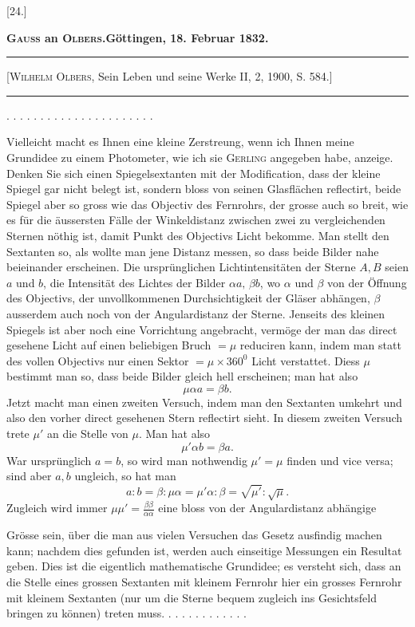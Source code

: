 \clearpage\begingroup
{}
\begin{center}
[24.]\par\medskip
\textbf{\textsc{Gauss} an \textsc{Olbers}.\quad Göttingen, 18. Februar 1832.}\par\medskip
\rule{.78\linewidth}{.4pt}\par\smallskip
{\footnotesize [\textsc{Wilhelm Olbers}, Sein Leben und seine Werke II, 2, 1900, S. 584.]}\par\smallskip
\rule{.78\linewidth}{.4pt}
\end{center}
\noindent . . . . . . . . . . . . . . . . . . . . . .\par
\noindent\hspace*{\parindent}Vielleicht macht es Ihnen eine kleine Zerstreung, wenn ich Ihnen meine Grundidee zu einem Photometer, wie ich sie \textsc{Gerling} angegeben habe, anzeige. Denken Sie sich einen Spiegelsextanten mit der Modification, dass der kleine Spiegel gar nicht belegt ist, sondern bloss von seinen Glasflächen reflectirt, beide Spiegel aber  so gross wie das Objectiv des Fernrohrs, der grosse auch so breit, wie es für die äussersten Fälle der Winkeldistanz zwischen zwei zu vergleichenden Sternen nöthig ist, damit  Punkt des Objectivs Licht bekomme. Man stellt den Sextanten so, als wollte man jene Distanz messen, so dass beide Bilder nahe beieinander erscheinen. Die ursprünglichen Lichtintensitäten der Sterne $A,B$ seien $a$ und $b$, die Intensität des Lichtes der Bilder $\alpha a,\,\beta b$, wo $\alpha$ und $\beta$ von der Öffnung des Objectivs, der unvollkommenen Durchsichtigkeit der Gläser abhängen, $\beta$ ausserdem auch noch von der Angulardistanz der Sterne. Jenseits des kleinen Spiegels ist aber noch eine Vorrichtung angebracht, vermöge der man das direct gesehene Licht auf einen beliebigen Bruch $=\mu$ reduciren kann, indem man statt des vollen Objectivs nur einen Sektor $=\mu\times360^{0}$ Licht verstattet. Diess $\mu$ bestimmt man so, dass beide Bilder gleich hell erscheinen; man hat also
\[
\mu\alpha a=\beta b.
\]
\noindent Jetzt macht man einen zweiten Versuch, indem man den Sextanten umkehrt und also den vorher direct gesehenen Stern reflectirt sieht. In diesem zweiten Versuch trete $\mu'$ an die Stelle von $\mu$. Man hat also
\[
\mu'\alpha b=\beta a.
\]
\noindent War ursprünglich $a=b$, so wird man nothwendig $\mu'=\mu$ finden und vice versa; sind aber $a,b$ ungleich, so hat man
\[
a:b=\beta:\mu\alpha=\mu'\alpha:\beta=\sqrt{\mu'}:\sqrt{\mu}.
\]
\noindent Zugleich wird immer $\mu\mu'=\frac{\beta\beta}{\alpha\alpha}$ eine bloss von der Angulardistanz abhängige
\par\clearpage{}
\noindent Grösse sein, über die man aus vielen Versuchen das Gesetz ausfindig machen kann; nachdem dies gefunden ist, werden auch einseitige Messungen ein Resultat geben. Dies ist die eigentlich mathematische Grundidee; es versteht sich, dass an die Stelle eines grossen Sextanten mit kleinem Fernrohr hier ein grosses Fernrohr mit kleinem Sextanten (nur um die Sterne bequem zugleich ins Gesichtsfeld bringen zu können) treten muss. . . . . . . . . . . . .
\clearpage\endgroup
